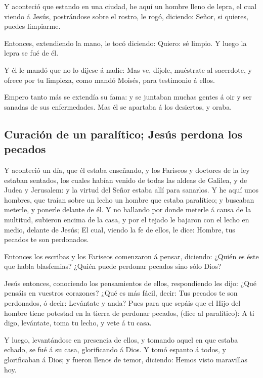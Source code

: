  Y aconteció que estando en una ciudad, he aquí un hombre
lleno de lepra, el cual viendo á Jesús, postrándose sobre el rostro, le
rogó, diciendo: Señor, si quieres, puedes limpiarme.

 Entonces, extendiendo la mano, le tocó diciendo: Quiero:
sé limpio. Y luego la lepra se fué de él.

 Y él le mandó que no lo dijese á nadie: Mas ve, díjole,
muéstrate al sacerdote, y ofrece por tu limpieza, como mandó Moisés,
para testimonio á ellos.

 Empero tanto más se extendía su fama: y se juntaban
muchas gentes á oir y ser sanadas de sus enfermedades. 
Mas él se apartaba á los desiertos, y oraba.

\hypertarget{curaciuxf3n-de-un-paraluxedtico-jesuxfas-perdona-los-pecados}{%
\subsection{Curación de un paralítico; Jesús perdona los
pecados}\label{curaciuxf3n-de-un-paraluxedtico-jesuxfas-perdona-los-pecados}}

 Y aconteció un día, que él estaba enseñando, y los
Fariseos y doctores de la ley estaban sentados, los cuales habían venido
de todas las aldeas de Galilea, y de Judea y Jerusalem: y la virtud del
Señor estaba allí para sanarlos.  Y he aquí unos hombres,
que traían sobre un lecho un hombre que estaba paralítico; y buscaban
meterle, y ponerle delante de él.  Y no hallando por
donde meterle á causa de la multitud, subieron encima de la casa, y por
el tejado le bajaron con el lecho en medio, delante de Jesús;
 El cual, viendo la fe de ellos, le dice: Hombre, tus
pecados te son perdonados.

 Entonces los escribas y los Fariseos comenzaron á
pensar, diciendo: ¿Quién es éste que habla blasfemias? ¿Quién puede
perdonar pecados sino sólo Dios?

 Jesús entonces, conociendo los pensamientos de ellos,
respondiendo les dijo: ¿Qué pensáis en vuestros corazones?
 ¿Qué es más fácil, decir: Tus pecados te son perdonados,
ó decir: Levántate y anda?  Pues para que sepáis que el
Hijo del hombre tiene potestad en la tierra de perdonar pecados, (dice
al paralítico): A ti digo, levántate, toma tu lecho, y vete á tu casa.

 Y luego, levantándose en presencia de ellos, y tomando
aquel en que estaba echado, se fué á su casa, glorificando á Dios.
 Y tomó espanto á todos, y glorificaban á Dios; y fueron
llenos de temor, diciendo: Hemos visto maravillas hoy.

